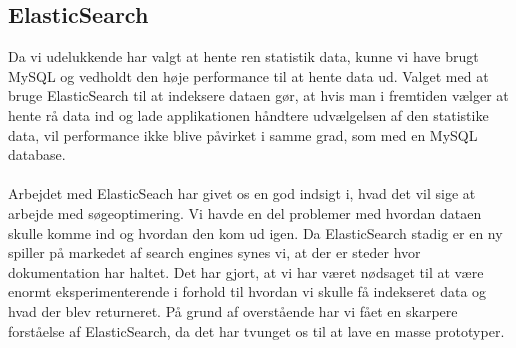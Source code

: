 \subsection{ElasticSearch}
Da vi udelukkende har valgt at hente ren statistik data, kunne vi have brugt MySQL og vedholdt den høje performance til at hente data ud. 
Valget med at bruge ElasticSearch til at indeksere dataen gør, at hvis man i fremtiden vælger at hente rå data ind og lade applikationen håndtere
udvælgelsen af den statistike data, vil performance ikke blive påvirket i samme grad, som med en MySQL database.
\\\\
Arbejdet med ElasticSeach har givet os en god indsigt i, hvad det vil sige at arbejde med søgeoptimering.
Vi havde en del problemer med hvordan dataen skulle komme ind og hvordan den kom ud igen. 
Da ElasticSearch stadig er en ny spiller på markedet af search engines synes vi, at der er steder hvor dokumentation har haltet.
Det har gjort, at vi har været nødsaget til at være enormt eksperimenterende i forhold til hvordan vi skulle få indekseret data og hvad der blev returneret.
På grund af overstående har vi fået en skarpere forståelse af ElasticSearch, da det har tvunget os til at lave en masse prototyper.

